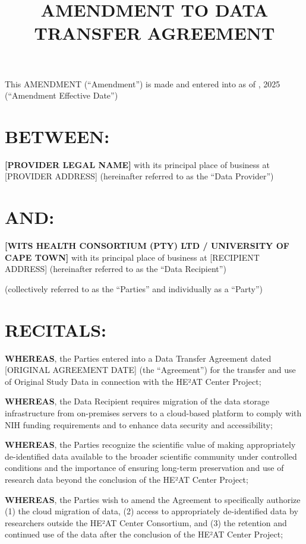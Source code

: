 \documentclass[12pt,letterpaper]{article}
\title{\textbf{AMENDMENT TO DATA TRANSFER AGREEMENT}}
\author{}
\date{}
\begin{document}
\maketitle

This AMENDMENT (``Amendment'') is made and entered into as of \underline{\hspace{5cm}}, 2025 (``Amendment Effective Date'')

\section*{BETWEEN:}

\textbf{[PROVIDER LEGAL NAME]} with its principal place of business at [PROVIDER ADDRESS] (hereinafter referred to as the ``Data Provider'')

\section*{AND:}

\textbf{[WITS HEALTH CONSORTIUM (PTY) LTD / UNIVERSITY OF CAPE TOWN]} with its principal place of business at [RECIPIENT ADDRESS] (hereinafter referred to as the ``Data Recipient'')

(collectively referred to as the ``Parties'' and individually as a ``Party'')

\section*{RECITALS:}

\textbf{WHEREAS}, the Parties entered into a Data Transfer Agreement dated [ORIGINAL AGREEMENT DATE] (the ``Agreement'') for the transfer and use of Original Study Data in connection with the HE²AT Center Project;

\textbf{WHEREAS}, the Data Recipient requires migration of the data storage infrastructure from on-premises servers to a cloud-based platform to comply with NIH funding requirements and to enhance data security and accessibility;

\textbf{WHEREAS}, the Parties recognize the scientific value of making appropriately de-identified data available to the broader scientific community under controlled conditions and the importance of ensuring long-term preservation and use of research data beyond the conclusion of the HE²AT Center Project;

\textbf{WHEREAS}, the Parties wish to amend the Agreement to specifically authorize (1) the cloud migration of data, (2) access to appropriately de-identified data by researchers outside the HE²AT Center Consortium, and (3) the retention and continued use of the data after the conclusion of the HE²AT Center Project;
\end{document}
